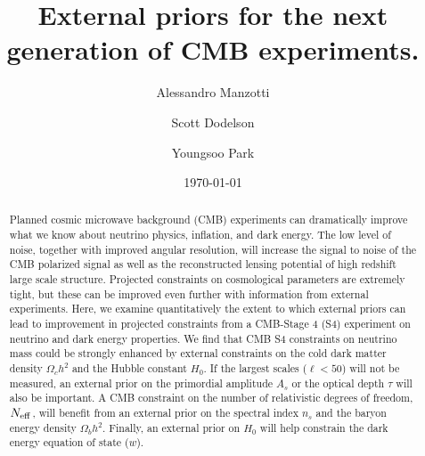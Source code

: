 \documentclass[aps,prd,reprint,superscriptaddress]{revtex4-1}
\begin{document}
\graphicspath{{images/}}

\title{External priors for the next generation of CMB experiments.}
\author{Alessandro Manzotti}
\author{Scott Dodelson}


\author{Youngsoo Park}


\date{\today}
\begin{abstract}
Planned cosmic microwave background (CMB) experiments can dramatically improve what we know about neutrino physics, inflation, and dark energy. 
The low level of noise, together with improved angular resolution, will increase the signal to noise of the CMB polarized signal as well as the reconstructed lensing potential of high redshift large scale structure. Projected constraints on cosmological parameters are extremely tight, but these can be improved even further with information from external experiments. Here, we examine quantitatively the extent to which external priors can lead to improvement in projected constraints from a CMB-Stage 4 (S4) experiment on neutrino and dark energy properties.
We find that CMB S4 constraints on neutrino mass could be strongly enhanced by external constraints on the cold dark matter density $\Omega_{c}h^{2}$ and the Hubble constant $H_{0}$. If the largest scales ($\ell<50$) will not be measured, an external prior on the primordial amplitude $A_{s}$ or the optical depth $\tau$ will also be important. A CMB constraint on the number of relativistic degrees of freedom, $N_{\rm eff}$, will benefit from an external prior on the spectral index $n_{s}$ and the baryon energy density $\Omega_{b}h^{2}$. Finally, an external prior on $H_{0}$ will help constrain the dark energy equation of state ($w$).
\end{abstract}

\pacs{}
\maketitle
\end{document}
